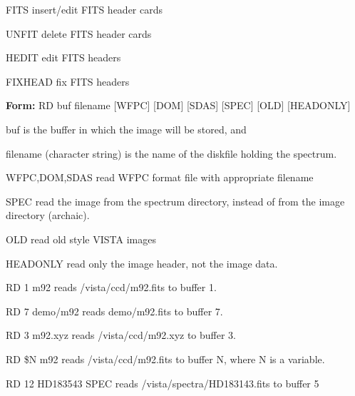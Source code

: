 {\newpage\clearpage
{}%
\begin{example}
  \item[FITS\hfill]{insert/edit FITS header cards}
  \item[UNFIT\hfill]{delete FITS header cards}
  \item[HEDIT\hfill]{edit FITS headers}
  \item[FIXHEAD\hfill]{fix FITS headers}
\end{example}%
\lthtmlfigureZ
\lthtmlcheckvsize\clearpage}

{\newpage\clearpage
{}%
\begin{command}
  \item[\textbf{Form: } RD buf filename {[WFPC]} {[DOM]} {[SDAS]}
       {[SPEC]} {[OLD]} {[HEADONLY]}\hfill]{}
  \item[buf]{is the buffer in which the image will be stored, and}
  \item[filename]{(character string) is the name of the diskfile holding
       the spectrum.}
  \item[WFPC,DOM,SDAS]{read WFPC format file with appropriate filename}
  \item[SPEC]{read the image from the spectrum directory, instead of from
       the image directory (archaic).}
  \item[OLD]{read old style VISTA images}
  \item[HEADONLY]{read only the image header, not the image data.}
\end{command}%
\lthtmlfigureZ
\lthtmlcheckvsize\clearpage}

{\newpage\clearpage
{}%
\begin{example}
  \item[RD 1 m92\hfill]{reads /vista/ccd/m92.fits  to buffer 1.}
  \item[RD 7 demo/m92\hfill]{reads demo/m92.fits to buffer 7.}
  \item[RD 3 m92.xyz\hfill]{reads /vista/ccd/m92.xyz  to buffer 3.}
  \item[RD \$N m92\hfill]{reads /vista/ccd/m92.fits  to buffer N, where
       N is a variable.}
  \item[RD 12 HD183543 SPEC\hfill]{reads /vista/spectra/HD183143.fits to
buffer 5}
\end{example}%
\lthtmlfigureZ
\lthtmlcheckvsize\clearpage}

